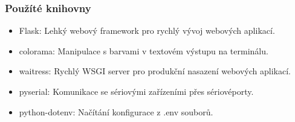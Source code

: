 \subsubsection{Použíté knihovny}
\begin{itemize}
    \item Flask: Lehký webový framework pro rychlý vývoj webových aplikací.
    \item colorama: Manipulace s barvami v textovém výstupu na terminálu.
    \item waitress: Rychlý WSGI server pro produkční nasazení webových aplikací.
    \item pyserial: Komunikace se sériovými zařízeními přes sériovéporty.
    \item python-dotenv: Načítání konfigurace z .env souborů.
\end{itemize}

